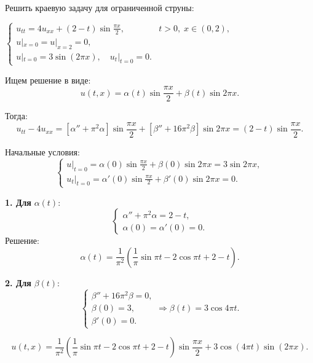 
\begin{cond}
	Решить краевую задачу для ограниченной струны:

	\(
	\begin{cases}
		u_{tt} = 4u_{xx} + (2 - t)\sin \frac{\pi x}{2}, & t > 0,\; x \in (0,2), \\
		u|_{x=0} = u|_{x=2} = 0,                                                \\
		u|_{t=0} = 3 \sin (2\pi x),\quad u_t|_{t=0} = 0.
	\end{cases}
	\)
\end{cond}

\begin{sol}
	Ищем решение в виде:
	\[
		u(t,x)=\alpha(t)\sin\frac{\pi x}{2}+\beta(t)\sin{2\pi x}.
	\]

	Тогда:
	\[
		u_{tt}-4u_{xx}=[\alpha''+\pi^2\alpha]\sin\frac{\pi x}{2}+[\beta''+16\pi^2\beta]\sin{2\pi x}=(2-t)\sin\frac{\pi x}{2}.
	\]

	Начальные условия:
	\[
		\begin{cases}
			u|_{t=0}=\alpha(0)\sin\frac{\pi x}{2}+\beta(0)\sin{2\pi x}=3\sin{2\pi x}, \\
			u_t|_{t=0}=\alpha'(0)\sin\frac{\pi x}{2}+\beta'(0)\sin{2\pi x}=0.
		\end{cases}
	\]

	\textbf{1. Для }$\alpha(t)$:
	\[
		\begin{cases}
			\alpha''+\pi^2\alpha=2-t, \\
			\alpha(0)=\alpha'(0)=0.
		\end{cases}
	\]
	Решение:
	\[
		\alpha(t)=\frac{1}{\pi^2}\!\left(\frac{1}{\pi}\sin{\pi t}-2\cos{\pi t}+2-t\right).
	\]

	\textbf{2. Для }$\beta(t)$:
	\[
		\begin{cases}
			\beta''+16\pi^2\beta=0, \\
			\beta(0)=3,             \\
			\beta'(0)=0.
		\end{cases}
		\Rightarrow
		\beta(t)=3\cos{4\pi t}.
	\]
\end{sol}

\begin{out}
	\[
		u(t,x)=\frac{1}{\pi^2}\!\left(\frac{1}{\pi}\sin{\pi t}-2\cos{\pi t}+2-t\right)\sin\frac{\pi x}{2}+3\cos(4\pi t)\sin(2\pi x).
	\]
\end{out}


